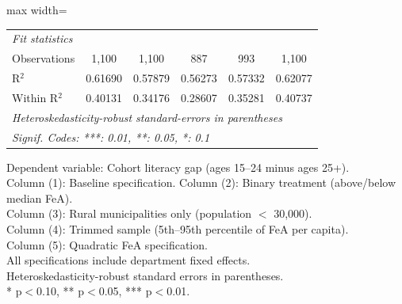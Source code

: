 \begin{table}[htbp]
\begin{adjustbox}{max width=\textwidth}
\begin{tabular}{lccccc}
      \midrule
      \emph{Fit statistics}\\
      Observations                  & 1,100           & 1,100           & 887             & 993             & 1,100\\  
      R$^2$                         & 0.61690         & 0.57879         & 0.56273         & 0.57332         & 0.62077\\  
      Within R$^2$                  & 0.40131         & 0.34176         & 0.28607         & 0.35281         & 0.40737\\  
      \midrule \midrule
      \multicolumn{6}{l}{\emph{Heteroskedasticity-robust standard-errors in parentheses}}\\
      \multicolumn{6}{l}{\emph{Signif. Codes: ***: 0.01, **: 0.05, *: 0.1}}\\
   \end{tabular}\end{adjustbox}
   
   \par \raggedright 
   Dependent variable: Cohort literacy gap (ages 15--24 minus ages 25+).\\
   Column (1): Baseline specification. Column (2): Binary treatment (above/below median FeA).\\
   Column (3): Rural municipalities only (population $<$ 30,000).\\
   Column (4): Trimmed sample (5th--95th percentile of FeA per capita).\\
   Column (5): Quadratic FeA specification.\\
   All specifications include department fixed effects.\\
   Heteroskedasticity-robust standard errors in parentheses.\\
   * p$<$0.10, ** p$<$0.05, *** p$<$0.01.
\end{table}



